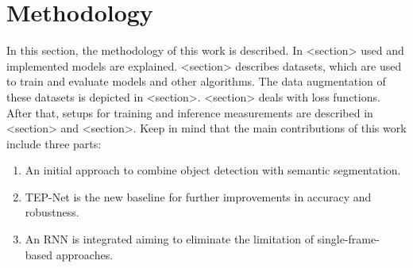 \chapter{Methodology}
\label{sec:methodology}


In this section, the methodology of this work is described.
In <section> used and implemented models are explained.
<section> describes datasets, which are used to train and evaluate models and other algorithms.
The data augmentation of these datasets is depicted in <section>.
<section> deals with loss functions. After that, setups for training and inference measurements are described in <section> and <section>.
Keep in mind that the main contributions of this work include three parts:

\begin{enumerate}
    \item An initial approach to combine object detection with semantic segmentation.
    \item TEP-Net \cite{tepNet2024} is the new baseline for further improvements in accuracy and robustness.
    \item An RNN is integrated aiming to eliminate the limitation of single-frame-based approaches.
\end{enumerate}


%







